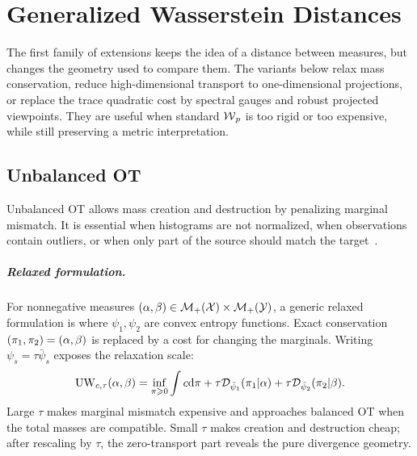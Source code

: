
\chapter{Generalized Wasserstein Distances}
\label{sec-extensions}
\label{sec-generalized-wasserstein-distances}

The first family of extensions keeps the idea of a distance between measures, but changes the geometry used to compare them. The variants below relax mass conservation, reduce high-dimensional transport to one-dimensional projections, or replace the trace quadratic cost by spectral gauges and robust projected viewpoints. They are useful when standard $\operatorname{\mathcal{W}}_p$ is too rigid or too expensive, while still preserving a metric interpretation.

\section{Unbalanced OT}
\label{sec-unbalanced}

Unbalanced OT allows mass creation and destruction by penalizing marginal mismatch. It is essential when histograms are not normalized, when observations contain outliers, or when only part of the source should match the target~\cite{LieroMielkeSavareLong,2015-chizat-unbalanced,2017-chizat-focm}.

\paragraph{Relaxed formulation.}

For nonnegative measures $(\alpha,\beta) \in \mathcal{M}_+(\mathcal{X}) \times \mathcal{M}_+(\mathcal{Y})$, a generic relaxed formulation is
where $\psi_1,\psi_2$ are convex entropy functions. Exact conservation $(\pi_1,\pi_2)=(\alpha,\beta)$ is replaced by a cost for changing the marginals. Writing $\psi_s=\tau\bar\psi_s$ exposes the relaxation scale:
\[
	\operatorname{UW}_{c,\tau}(\alpha,\beta)
	=
	\inf_{\pi\geqslant0}
	\int c\mathrm{d}\pi
	+
	\tau\mathcal{D}_{\bar\psi_1}(\pi_1|\alpha)
	+
	\tau\mathcal{D}_{\bar\psi_2}(\pi_2|\beta).
\]
Large $\tau$ makes marginal mismatch expensive and approaches balanced OT when the total masses are compatible. Small $\tau$ makes creation and destruction cheap; after rescaling by $\tau$, the zero-transport part reveals the pure divergence geometry.


